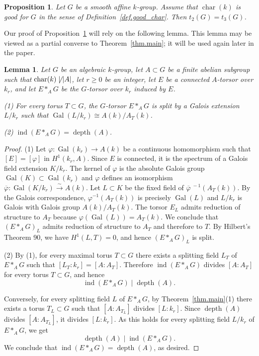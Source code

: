 \documentclass[12pt]{amsart}
\numberwithin{equation}{section}
\newtheorem{lemma}[theorem]{Lemma}
\newtheorem{proposition}[theorem]{Proposition}
\theoremstyle{remark}
\newcommand{\vphi}{\varphi}
\newcommand{\Gal}{\operatorname{Gal}}
\newcommand{\ind}{\operatorname{ind}}
\newcommand{\Char}{\operatorname{char}}
\newcommand{\depth}{\operatorname{depth}}
\begin{document}
\begin{proposition} \label{prop.torsion-a}  Let $G$ be a smooth affine $k$-group. Assume that $\Char(k)$ is good for $G$ in the sense of Definition~\ref{def.good_char}. Then $t_2(G) = t_3(G)$.
\end{proposition}

Our proof of Proposition~\ref{prop.torsion-a} will rely on the following lemma. This lemma may be viewed as a partial converse to Theorem~\ref{thm.main}; it will be used again later in the paper.

\begin{lemma} \label{lem.index_equals_depth}
    Let $G$ be an algebraic $k$-group, let $A\subset G$ be a finite abelian subgroup such that $\Char(k)\not\mid |A|$, let $r\geqslant 0$ be an integer, let $E$ be a connected $A$-torsor over $k_r$, and let $E*_AG$ be the $G$-torsor over $k_r$ induced by $E$.
    
    \smallskip
    (1) For every torus $T\subset G$, the $G$-torsor $E*_AG$ is split by a Galois extension $L/k_r$ such that $\Gal(L/k_r) \cong A(k)/A_T(k)$.

    \smallskip
    (2) 
$\ind(E*_AG) = \depth(A)$.
        \end{lemma}

\begin{proof}
(1)  Let $\vphi\colon \Gal(k_r)\to A(k)$ be a continuous homomorphism such that $[E] = [\vphi]$ in $H^1(k_r,A)$. Since $E$ is connected, it is the spectrum of a Galois field extension $K/k_r$. The kernel of $\vphi$ is the absolute Galois group $\Gal(K)\subset \Gal(k_r)$ and $\vphi$ defines an isomorphism $\overline{\vphi}\colon\Gal(K/k_r) \xrightarrow{\sim} A(k)$. Let $L\subset K$ be the fixed field of $\overline{\vphi}^{\; -1}(A_T(k))$. By the Galois correspondence, 
$\vphi^{-1}(A_T(k))$ is precisely $\Gal(L)$ and  $L/k_r$ is Galois with Galois group $A(k)/A_T(k)$. The torsor $E_L$ admits reduction of structure to $A_T$ because $\vphi(\Gal(L))= A_T(k)$. We conclude that $(E*_A G)_L$ admits reduction of structure to $A_T$ and therefore to $T$. By Hilbert's Theorem 90, we have $H^1(L,T) = 0$, and hence $(E*_AG)_L$ is split.

\smallskip
(2) By (1), for every maximal torus $T\subset G$ there exists a splitting field $L_T$ of $E*_AG$ such that $[L_T:k_r] = [A:A_T]$. Therefore $\ind(E*_AG)$ divides $[A:A_T]$ for every torus $T\subset G$, and hence \[ \ind(E*_AG)\mid \depth(A). \]

Conversely, for every splitting field $L$ of $E*_AG$, by Theorem~\ref{thm.main}(1) there exists a torus $T_L \subset G$ such that $[A:A_{T_L}]$ divides $[L:k_r]$. Since $\depth(A)$ divides $[A:A_{T_L}]$, it divides $[L:k_r]$. As this holds for every splitting field $L/k_r$ of $E*_AG$, we get \[ \depth(A)\mid \ind(E*_AG). \] 
We conclude that $\ind(E*_AG)=\depth(A)$, as desired.
\end{proof}
\end{document}
